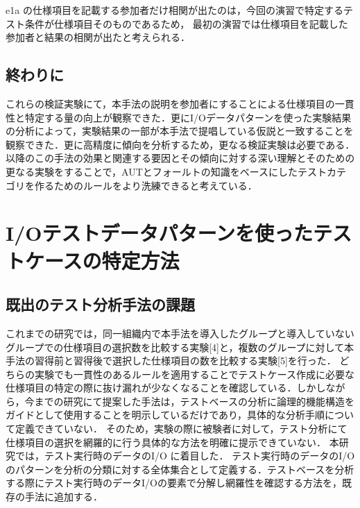 \documentclass[a4paper,12pt]{jreport}
\begin{document}
e1a の仕様項目を記載する参加者だけ相関が出たのは，今回の演習で特定するテスト条件が仕様項目そのものであるため， 最初の演習では仕様項目を記載した参加者と結果の相関が出たと考えられる．

\section{終わりに}
これらの検証実験にて，本手法の説明を参加者にすることによる仕様項目の一貫性と特定する量の向上が観察できた．更にI/Oデータパターンを使った実験結果の分析によって，実験結果の一部が本手法で提唱している仮説と一致することを観察できた．更に高精度に傾向を分析するため，更なる検証実験は必要である．以降のこの手法の効果と関連する要因とその傾向に対する深い理解とそのための更なる実験をすることで，AUTとフォールトの知識をベースにしたテストカテゴリを作るためのルールをより洗練できると考えている．

\chapter{I/Oテストデータパターンを使ったテストケースの特定方法}
\section{既出のテスト分析手法の課題}
これまでの研究では，同一組織内で本手法を導入したグループと導入していないグループでの仕様項目の選択数を比較する実験[4]と，複数のグループに対して本手法の習得前と習得後で選択した仕様項目の数を比較する実験[5]を行った．
どちらの実験でも一貫性のあるルールを適用することでテストケース作成に必要な仕様項目の特定の際に抜け漏れが少なくなることを確認している．しかしながら，今までの研究にて提案した手法は，テストベースの分析に論理的機能構造をガイドとして使用することを明示しているだけであり，具体的な分析手順について定義できていない．
そのため，実験の際に被験者に対して，テスト分析にて仕様項目の選択を網羅的に行う具体的な方法を明確に提示できていない．
本研究では，テスト実行時のデータのI/O に着目した．
テスト実行時のデータのI/Oのパターンを分析の分類に対する全体集合として定義する．テストベースを分析する際にテスト実行時のデータI/Oの要素で分解し網羅性を確認する方法を，既存の手法に追加する．
\end{document}
